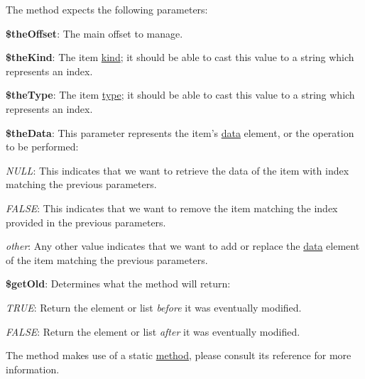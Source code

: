 The method expects the following parameters\-:


\begin{DoxyItemize}
\item {\bfseries \$the\-Offset}\-: The main offset to manage. 
\item {\bfseries \$the\-Kind}\-: The item \hyperlink{}{kind}; it should be able to cast this value to a string which represents an index. 
\item {\bfseries \$the\-Type}\-: The item \hyperlink{}{type}; it should be able to cast this value to a string which represents an index. 
\item {\bfseries \$the\-Data}\-: This parameter represents the item's \hyperlink{}{data} element, or the operation to be performed\-: 
\begin{DoxyItemize}
\item {\itshape N\-U\-L\-L}\-: This indicates that we want to retrieve the data of the item with index matching the previous parameters. 
\item {\itshape F\-A\-L\-S\-E}\-: This indicates that we want to remove the item matching the index provided in the previous parameters. 
\item {\itshape other}\-: Any other value indicates that we want to add or replace the \hyperlink{}{data} element of the item matching the previous parameters. 
\end{DoxyItemize}
\item {\bfseries \$get\-Old}\-: Determines what the method will return\-: 
\begin{DoxyItemize}
\item {\itshape T\-R\-U\-E}\-: Return the element or list {\itshape before} it was eventually modified. 
\item {\itshape F\-A\-L\-S\-E}\-: Return the element or list {\itshape after} it was eventually modified. 
\end{DoxyItemize}
\end{DoxyItemize}

The method makes use of a static \hyperlink{class_c_attribute_a200333aed4419e123658883a9e4495e2}{method}, please consult its reference for more information.


